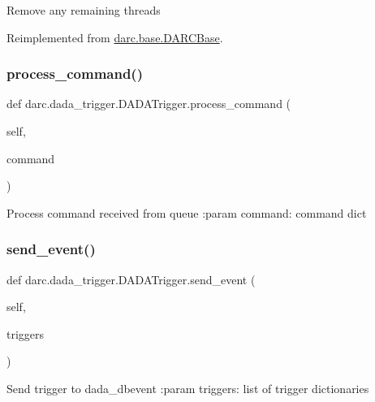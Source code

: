 \begin{DoxyVerb}Remove any remaining threads
\end{DoxyVerb}
 

Reimplemented from \mbox{\hyperlink{classdarc_1_1base_1_1_d_a_r_c_base}{darc.\+base.\+D\+A\+R\+C\+Base}}.

\mbox{\label{classdarc_1_1dada__trigger_1_1_d_a_d_a_trigger_a1a42a6dc733db491c93058ef37e7815b}} 
\subsubsection{\texorpdfstring{process\_command()}{process\_command()}}
{\footnotesize\ttfamily def darc.\+dada\+\_\+trigger.\+D\+A\+D\+A\+Trigger.\+process\+\_\+command (\begin{DoxyParamCaption}\item[{}]{self,  }\item[{}]{command }\end{DoxyParamCaption})}

\begin{DoxyVerb}Process command received from queue
:param command: command dict
\end{DoxyVerb}
 \mbox{\label{classdarc_1_1dada__trigger_1_1_d_a_d_a_trigger_ae5ba915ae331c8db0ef06667737a49a1}} 
\subsubsection{\texorpdfstring{send\_event()}{send\_event()}}
{\footnotesize\ttfamily def darc.\+dada\+\_\+trigger.\+D\+A\+D\+A\+Trigger.\+send\+\_\+event (\begin{DoxyParamCaption}\item[{}]{self,  }\item[{}]{triggers }\end{DoxyParamCaption})}

\begin{DoxyVerb}Send trigger to dada_dbevent
:param triggers: list of trigger dictionaries
\end{DoxyVerb}
 \mbox{\label{classdarc_1_1dada__trigger_1_1_d_a_d_a_trigger_a6762774a9b6a7d072e10ccd2e818d8cf}} 
